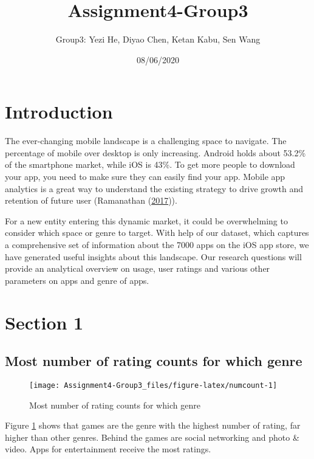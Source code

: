 \documentclass[
]{article}
\title{Assignment4-Group3}
\author{Group3: Yezi He, Diyao Chen, Ketan Kabu, Sen Wang}
\date{08/06/2020}
\begin{document}
\maketitle

{
\setcounter{tocdepth}{2}
\tableofcontents
}
\hypertarget{introduction}{%
\section{Introduction}\label{introduction}}

The ever-changing mobile landscape is a challenging space to navigate. The percentage of mobile over desktop is only increasing. Android holds about 53.2\% of the smartphone market, while iOS is 43\%. To get more people to download your app, you need to make sure they can easily find your app. Mobile app analytics is a great way to understand the existing strategy to drive growth and retention of future user (Ramanathan (\protect\hyperlink{ref-dataset}{2017})).

For a new entity entering this dynamic market, it could be overwhelming to consider which space or genre to target. With help of our dataset, which captures a comprehensive set of information about the 7000 apps on the iOS app store, we have generated useful insights about this landscape. Our research questions will provide an analytical overview on usage, user ratings and various other parameters on apps and genre of apps.

\hypertarget{section-1}{%
\section{Section 1}\label{section-1}}

\hypertarget{most-number-of-rating-counts-for-which-genre}{%
\subsection{Most number of rating counts for which genre}\label{most-number-of-rating-counts-for-which-genre}}

\begin{figure}

{\centering \texttt{[image: Assignment4-Group3\_files/figure-latex/numcount-1]} 

}

\caption{Most number of rating counts for which genre}\label{fig:numcount}
\end{figure}

Figure \ref{fig:numcount} shows that games are the genre with the highest number of rating, far higher than other genres.
Behind the games are social networking and photo \& video. Apps for entertainment receive the most ratings.
\end{document}
